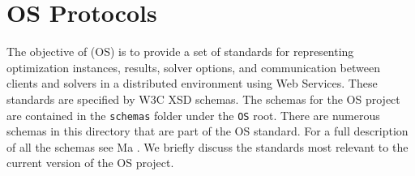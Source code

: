 \documentclass[11pt]{article}
\renewcommand{\_}{{\char"5F}}
\renewcommand{\{}{{\char"7B}}
\renewcommand{\}}{{\char"7D}}
\renewcommand{\^}{{\char"0D}}
\renewcommand{\'}{{\char"0D}}
\begin{document}
\section{OS Protocols}\label{section:schemadescriptions}



The objective of  (OS) is to provide a set of standards for representing optimization instances, results, solver options, and communication between clients and solvers in a distributed environment using Web Services.  These standards are specified by W3C XSD schemas. The schemas for the OS project are contained in the {\tt schemas} folder under the {\tt OS} root. There are numerous schemas in this directory that are part of the OS standard. For a full description of all the schemas see  Ma \cite{junma2005}.  We briefly discuss the standards most relevant to the current version of the OS project. 
\end{document}
